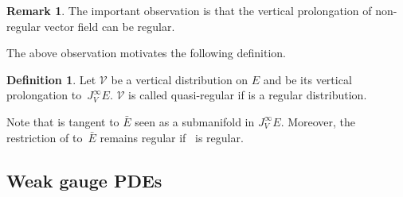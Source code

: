 \documentclass[10pt,a4paper]{amsart}
\numberwithin{equation}{section}
\theoremstyle{definition}
\newtheorem{Definition}[Theorem]{Definition}
\newtheorem{Remark}[Theorem]{Remark}
\renewcommand{\tilde}{\widetilde}
\newcommand{\vprol}{\tilde}
\begin{document}
\begin{Remark}
The important observation is that the vertical prolongation of non-regular vector field can be regular.
\end{Remark}
The above observation motivates the following definition.

\begin{Definition}
 Let $\mathcal{V}$ be a vertical distribution on $E$ and \smash{$\vprol{\mathcal{V}}$} be its vertical prolongation to~$J^{\infty}_VE$. $\mathcal{V}$ is called quasi-regular if \smash{$\vprol{\mathcal{V}}$} is a regular distribution.
\end{Definition}
Note that \smash{$\vprol{\mathcal{V}}$} is tangent to $\bar E$ seen as a submanifold in $J^{\infty}_VE$. Moreover, the restriction of \smash{$\vprol{\mathcal{V}}$} to~$\bar E$ remains regular if~\smash{$\vprol{\mathcal{V}}$} is regular.

\subsection{Weak gauge PDEs}
\end{document}
